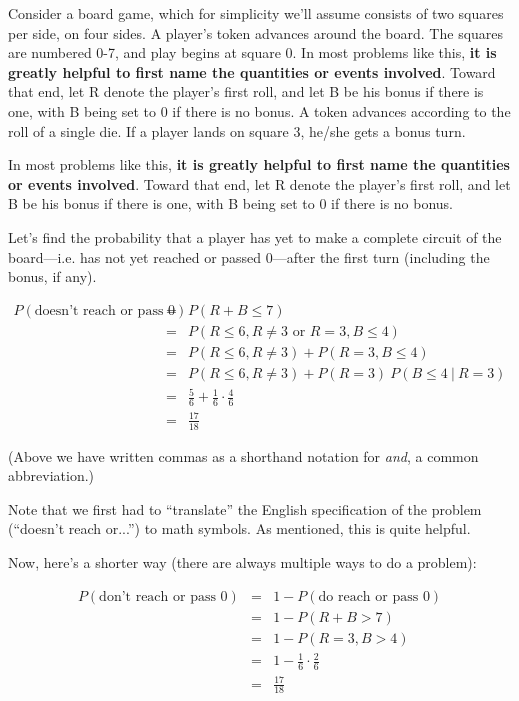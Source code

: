 Consider a board game, which for simplicity we'll assume consists of two
squares per side, on four sides.  A player's token advances around the
board.  The squares are numbered 0-7, and play begins at square 0.  In
most problems like this, {\bf it is greatly helpful to first name the
quantities or events involved}.  Toward that end, let R denote the
player's first roll, and let B be his bonus if there is one, with B
being set to 0 if there is no bonus.  A token advances according to the
roll of a single die.  If a player lands on square 3, he/she gets a
bonus turn.

In most problems like this, {\bf it is greatly helpful to first name the
quantities or events involved}.  Toward that end, let R denote the
player's first roll, and let B be his bonus if there is one, with B
being set to 0 if there is no bonus.  

Let's find the probability that a player has yet to make a complete
circuit of the board---i.e. has not yet reached or passed 0---after the
first turn (including the bonus, if any).

\begin{eqnarray}
P(\textrm{doesn't reach or pass 0}) &=& P(R+B \leq 7) \\ 
&=& P(R \leq 6, R \neq 3 \textrm{ or } R = 3, B \leq 4) \\
&=& P(R \leq 6, R \neq 3) + P(R = 3, B \leq 4) \\
&=& P(R \leq 6, R \neq 3) + P(R = 3) ~ P(B \leq 4 ~|~ R = 3) \\
&=& \frac{5}{6} + \frac{1}{6} \cdot \frac{4}{6} \\
&=& \frac{17}{18}
\end{eqnarray}

(Above we have written commas as a shorthand notation for {\it and}, a
common abbreviation.)

Note that we first had to ``translate'' the English specification of the
problem (``doesn't reach or...'') to math symbols.  As mentioned, this
is quite helpful.

Now, here's a shorter way (there are always multiple ways to do a
problem):

\begin{eqnarray}
P(\textrm{don't reach or pass 0}) &=& 1 - P(\textrm{do reach or pass 0}) \\ 
&=& 1 - P(R + B > 7) \\
&=& 1 - P(R = 3,  B > 4) \\
&=& 1 - \frac{1}{6} \cdot \frac{2}{6} \\
&=& \frac{17}{18}
\end{eqnarray}


